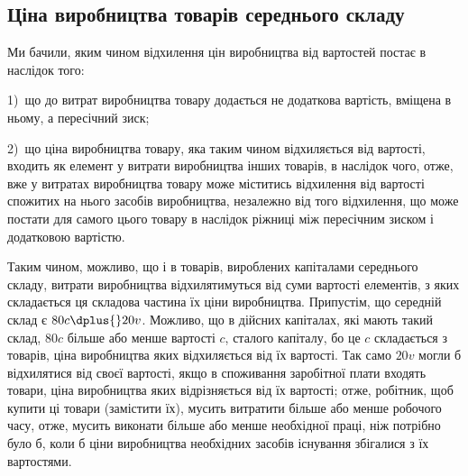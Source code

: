 
\subsection{Ціна виробництва товарів середнього складу}

Ми бачили, яким чином відхилення цін виробництва від вартостей постає в наслідок того:

1)~що до витрат виробництва товару додається не додаткова вартість, вміщена в ньому, а
пересічний зиск;

2)~що ціна виробництва товару, яка таким чином відхиляється від вартості, входить як елемент
у витрати виробництва інших товарів, в наслідок чого, отже, вже у витратах виробництва товару може
міститись відхилення від вартості спожитих на нього засобів виробництва, незалежно від того
відхилення, що може постати для самого цього товару в наслідок ріжниці між пересічним зиском і
додатковою вартістю.

Таким чином, можливо, що і в товарів, вироблених капіталами середнього складу, витрати виробництва
відхилятимуться від суми вартості елементів, з яких складається ця складова частина їх ціни
виробництва. Припустім, що середній склад є $80 c \dplus{} 20 v$. Можливо, що в дійсних капіталах, які мають
такий склад, $80  c$ більше або менше вартості $c$, сталого капіталу, бо це $c$ складається з товарів,
ціна виробництва яких відхиляється від їх вартості. Так само $20 v$  могли б відхилятися від своєї
вартості, якщо в споживання заробітної плати входять товари, ціна виробництва яких відрізняється від
їх вартості; отже, робітник, щоб купити ці товари (замістити їх), мусить витратити більше або менше
робочого часу, отже, мусить виконати більше або менше необхідної праці, ніж потрібно було б, коли б
ціни виробництва
необхідних засобів існування збігалися з їх вартостями.

